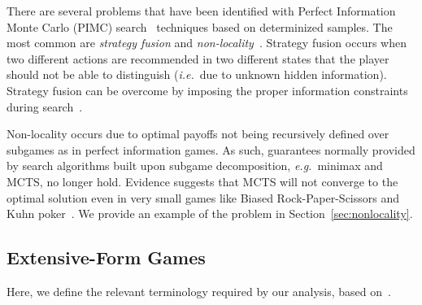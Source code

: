\documentclass{aamas2015}
\newcommand{\ie}{{\it i.e.}~}
\newcommand{\eg}{{\it e.g.}~}
\begin{document}
There are several problems that have been identified with Perfect Information Monte Carlo
(PIMC) search~\cite{Long10Understanding} techniques
based on determinized samples. The most common are {\it strategy fusion} and {\it non-locality}~\cite{Frank98Finding}.
Strategy fusion occurs when two different actions are recommended in two different states that the player 
should not be able to distinguish (\ie due to unknown hidden information).
Strategy fusion can be overcome by imposing the proper information constraints during 
search~\cite{Frank98Finding,Ciancarini10Kriegspiel,Ponsen11Computing,Lisy12peg,Cowling12ISMCTS}. 

Non-locality occurs due to optimal payoffs not being recursively defined over subgames as  
in perfect information games. As such, guarantees normally provided by search algorithms built upon 
subgame decomposition, \eg minimax and MCTS, no longer hold. 
Evidence suggests that MCTS will not converge to the optimal solution even in very
small games like Biased Rock-Paper-Scissors and Kuhn poker~\cite{Shafiei09,Ponsen11Computing}.
We provide an example of the problem in Section~\ref{sec:nonlocality}. 

\subsection{Extensive-Form Games}


Here, we define the relevant terminology required by our analysis, based on~\cite{OsbRub94}. 

\end{document}
